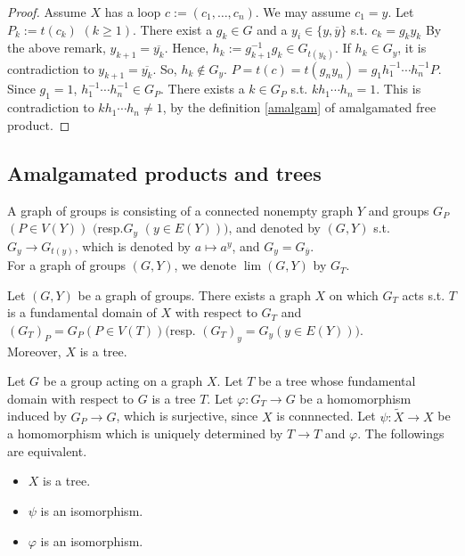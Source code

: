 \begin{proof}
  Assume $X$ has a loop $c := (c_1 , \ldots , c_n )$.
  We may assume $c_1 = y$.
  Let $P_k := t(c_k)$ $(k \geq 1)$.
  There exist a $g_k \in G$ and a $y_i \in \{y, \overline{y}\}$ s.t. $c_k = g_k y_k$
  By the above remark,
  $y_{k+1} = \overline{y_k} $. 
  Hence, $h_k := g_{k+1}^{-1}g_k \in G_{t(y_k)}$.
  If $h_k \in G_y$, it is contradiction to $y_{k+1} = \overline{y_k}$.
  So, $h_k \notin G_y$.
  $P = t(c) = t(g_n y_n) = g_1 h_1^{-1} \cdots h_n^{-1} P$.
  Since $g_1 = 1$, $h_1^{-1} \cdots h_n^{-1} \in G_P$.
  There exists a $k \in G_P$ s.t. $k h_1 \cdots h_n =1$.
  This is contradiction to $k h_1 \cdots h_n \neq 1$, by the definition \ref{amalgam} of amalgamated free product. 
\end{proof}

\subsection{Amalgamated products and trees}

\begin{definition}
  A graph of groups is consisting of a connected nonempty graph $Y$ and groups $G_P$ $(P \in V(Y))$ $($resp.$G_y$ $(y \in E(Y)))$, and denoted by $(G,Y)$ s.t. $G_y \rightarrow G_{t(y)}$, which is denoted by $a \mapsto a^y$, and $G_y = G_{\overline{y}}$.\\
  For a graph of groups $(G,Y)$, we denote $\lim (G,Y)$ by $G_T$.
\end{definition}

\begin{theorem}
  Let $(G,Y)$ be a graph of groups.
  There exists a graph $X$ on which $G_T$ acts s.t. $T$ is a fundamental domain of $X$ with respect to $G_T$ and $(G_T)_P = G_P (P \in V(T)) ($resp. $(G_T)_y=G_y (y \in E(Y)))$. \\
  Moreover, $X$ is a tree.
\end{theorem}

\begin{theorem}
  Let $G$ be a group acting on a graph $X$.
  Let $T$ be a tree whose fundamental domain with respect to $G$ is a tree $T$.
  Let $\varphi : G_T \rightarrow G$ be a homomorphism induced by $G_P \rightarrow G$, which is surjective, since $X$ is connnected.
  Let $\psi:\tilde{X} \rightarrow X$ be a homomorphism which is uniquely determined by $T \rightarrow T$ and $\varphi$.
  The followings are equivalent.
  \begin{itemize}
    \item $X$ is a tree.
    \item $\psi$ is an isomorphism.
    \item $\varphi$ is an isomorphism.
  \end{itemize}
\end{theorem}

